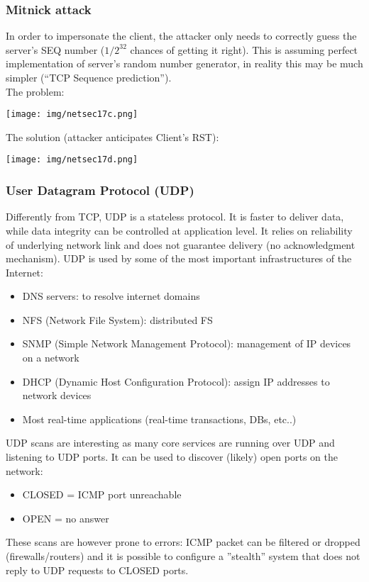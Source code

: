 \documentclass[a4paper, 10pt, titlepage]{article}
\begin{document}
\subsubsection{Mitnick attack}
In order to impersonate the client, the attacker only needs to correctly guess the server’s SEQ number ($1/2^{32}$ chances of getting it right). This is assuming perfect implementation of server’s random number generator, in reality this may be much simpler (“TCP Sequence prediction”). \medskip\\
The problem:
\begin{center}
	\texttt{[image: img/netsec17c.png]}
\end{center}
The solution (attacker anticipates Client's RST):
\begin{center}
	\texttt{[image: img/netsec17d.png]}
\end{center}

\subsubsection{User Datagram Protocol (UDP)}
Differently from TCP, UDP is a stateless protocol. It is faster to deliver data, while data integrity can be controlled at application level. It relies on reliability of underlying network link and does not guarantee delivery (no acknowledgment mechanism). UDP is used by some of the most important infrastructures of the Internet:
\begin{itemize}
	\item DNS servers: to resolve internet domains
	\item NFS (Network File System): distributed FS
	\item SNMP (Simple Network Management Protocol): management of IP devices on a network
	\item DHCP (Dynamic Host Configuration Protocol): assign IP addresses to network devices
	\item Most real-time applications (real-time transactions, DBs, etc..)
\end{itemize}
UDP scans are interesting as many core services are running over UDP and listening to UDP ports. It can be used to discover (likely) open ports on the network:
\begin{itemize}
	\item CLOSED = ICMP port unreachable
	\item OPEN = no answer
\end{itemize}
These scans are however prone to errors: ICMP packet can be filtered or dropped (firewalls/routers) and it is possible to configure a ”stealth” system that does not reply to UDP requests to CLOSED ports.
\end{document}
